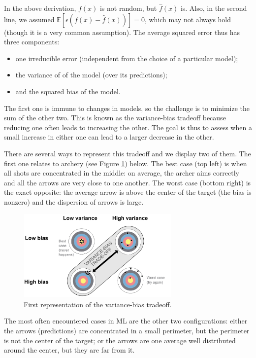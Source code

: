 \documentclass[]{krantz}
\providecommand{\tightlist}{%
  \setlength{\itemsep}{0pt}\setlength{\parskip}{0pt}}
\theoremstyle{definition}
\theoremstyle{definition}
\theoremstyle{definition}
\theoremstyle{remark}
\begin{document}
In the above derivation, \(f(x)\) is not random, but \(\hat{f}(x)\) is.
Also, in the second line, we assumed
\(\mathbb{E}[\epsilon(f(x)-\hat{f}(x))]=0\), which may not always hold
(though it is a very common assumption). The average squared error thus
has three components:

\begin{itemize}
\tightlist
\item
  one irreducible error (independent from the choice of a particular
  model);\\
\item
  the variance of of the model (over its predictions);
\item
  and the squared bias of the model.
\end{itemize}

The first one is immune to changes in models, so the challenge is to
minimize the sum of the other two. This is known as the variance-bias
tradeoff because reducing one often leads to increasing the other. The
goal is thus to assess when a small increase in either one can lead to a
larger decrease in the other.

There are several ways to represent this tradeoff and we display two of
them. The first one relates to archery (see Figure \ref{fig:archery})
below. The best case (top left) is when all shots are concentrated in
the middle: on average, the archer aims correctly and all the arrows are
very close to one another. The worst case (bottom right) is the exact
opposite: the average arrow is above the center of the target (the bias
is nonzero) and the dispersion of arrows is large.

\begin{figure}[H]

{\centering \includegraphics[width=300px]{images/var_bias_trade} 

}

\caption{First representation of the variance-bias tradeoff.}\label{fig:archery}
\end{figure}

The most often encountered cases in ML are the other two configurations:
either the arrows (predictions) are concentrated in a small perimeter,
but the perimeter is not the center of the target; or the arrows are one
average well distributed around the center, but they are far from it.
\end{document}
